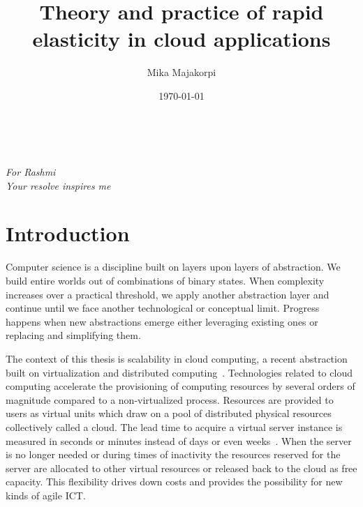 \documentclass[english]{tktltiki2}
\title{Theory and practice of rapid elasticity in cloud applications}
\author{Mika Majakorpi}
\date{\today}
\theoremstyle{definition}
\theoremstyle{remark}
\begin{document}

\maketitle        %
\makeabstract     %

\tableofcontents  %
\newpage          %


~\\[10\baselineskip]    
        \begin{center}
        \textit{For Rashmi}\\
        \textit{Your resolve inspires me}
        \end{center}


\listoftodos
\newpage


\section{Introduction}

Computer science is a discipline built on layers upon layers of abstraction. We
build entire worlds out of combinations of binary states. When complexity
increases over a practical threshold, we apply another abstraction layer and
continue until we face another technological or conceptual limit. Progress
happens when new abstractions emerge either leveraging existing ones or
replacing and simplifying them.

The context of this thesis is scalability in cloud computing, a recent
abstraction built on virtualization and distributed computing~\cite{handbook}.
Technologies related to cloud computing accelerate the provisioning of computing
resources by several orders of magnitude compared to a non-virtualized process.
Resources are provided to users as virtual units which draw on a pool of
distributed physical resources collectively called a cloud. The lead time to
acquire a virtual server instance is measured in seconds or minutes instead of
days or even weeks~\cite{elasticsiteMarshall2010}. When the server is no longer
needed or during times of inactivity the resources reserved for the server are
allocated to other virtual resources or released back to the cloud as free
capacity. This flexibility drives down costs and provides the possibility for
new kinds of agile ICT.
\end{document}
